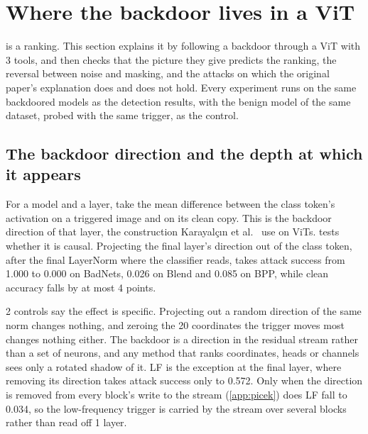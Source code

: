 \section{Where the backdoor lives in a ViT}
\label{sec:mechanism}

 is a ranking. This section explains it by following a backdoor through a ViT with 3 tools, and then checks that the picture they give predicts the ranking, the reversal between noise and masking, and the attacks on which the original paper's explanation does and does not hold. Every experiment runs on the same backdoored models as the detection results, with the benign model of the same dataset, probed with the same trigger, as the control.

\subsection{The backdoor direction and the depth at which it appears}
\label{sec:mechanism:direction}

For a model and a layer, take the mean difference between the class token's activation on a triggered image and on its clean copy. This is the backdoor direction of that layer, the construction Karayal\c{c}{\i}n et al.~\cite{karayalcin2026backdoor} use on ViTs.  tests whether it is causal. Projecting the final layer's direction out of the class token, after the final LayerNorm where the classifier reads, takes attack success from 1.000 to 0.000 on BadNets, 0.026 on Blend and 0.085 on BPP, while clean accuracy falls by at most 4 points.

2 controls say the effect is specific. Projecting out a random direction of the same norm changes nothing, and zeroing the 20 coordinates the trigger moves most changes nothing either. The backdoor is a direction in the residual stream rather than a set of neurons, and any method that ranks coordinates, heads or channels sees only a rotated shadow of it. LF is the exception at the final layer, where removing its direction takes attack success only to 0.572. Only when the direction is removed from every block's write to the stream (\cref{app:picek}) does LF fall to 0.034, so the low-frequency trigger is carried by the stream over several blocks rather than read off 1 layer.

